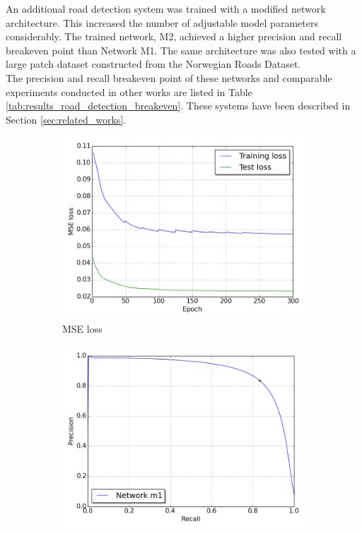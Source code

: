 An additional road detection system was trained with a modified network architecture. This increased the number of adjustable model parameters considerably. The trained network, M2, achieved a higher precision and recall breakeven point than Network M1. The same architecture was also tested with a large patch dataset constructed from the Norwegian Roads Dataset.\\

The precision and recall breakeven point of these networks and comparable experiments conducted in other works are listed in Table \ref{tab:results_road_detection_breakeven}. These systems have been described in Section \ref{sec:related_works}.\\

 
\begin{figure}
\begin{subfigure}{0.5\textwidth}
\includegraphics[width=\linewidth]{figs/E7/E7_lc_loss.png}
\caption{MSE loss} \label{fig:E7_performance_mass_lc}
\end{subfigure}
\hspace*{\fill} %
\begin{subfigure}{0.5\textwidth}
\includegraphics[width=\linewidth]{figs/E7/E7_pr.png}

\end{subfigure}
\end{figure}
